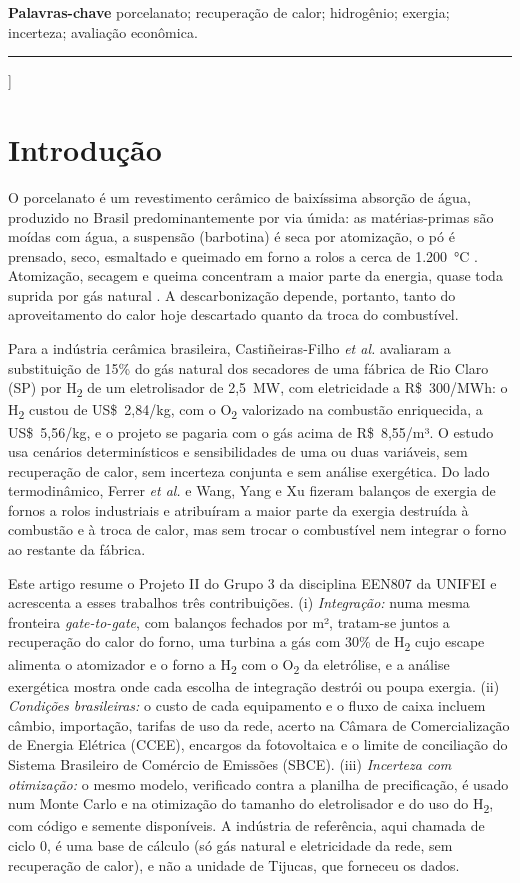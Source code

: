 \documentclass[10pt,a4paper,twocolumn]{article}
\newcommand{\Ht}{H\textsubscript{2}}
\newcommand{\Ot}{O\textsubscript{2}}
\begin{document}
{\vspace{3pt}
\noindent\textbf{Palavras-chave} porcelanato; recuperação de calor; hidrogênio; exergia; incerteza; avaliação econômica.\par
\noindent\rule{\textwidth}{0.4pt}\par\vspace{8pt}
}]

\section{Introdução}

O porcelanato é um revestimento cerâmico de baixíssima absorção de água, produzido no Brasil predominantemente por via úmida: as matérias-primas são moídas com água, a suspensão (barbotina) é seca por atomização, o pó é prensado, seco, esmaltado e queimado em forno a rolos a cerca de 1.200~°C \cite{oliveira2015}. Atomização, secagem e queima concentram a maior parte da energia, quase toda suprida por gás natural \cite{mctic2017,monfort2010}. A descarbonização depende, portanto, tanto do aproveitamento do calor hoje descartado quanto da troca do combustível.

Para a indústria cerâmica brasileira, Castiñeiras-Filho \textit{et al.} \cite{castineiras2025} avaliaram a substituição de 15\% do gás natural dos secadores de uma fábrica de Rio Claro (SP) por \Ht{} de um eletrolisador de 2,5~MW, com eletricidade a R\$~300/MWh: o \Ht{} custou de US\$~2,84/kg, com o \Ot{} valorizado na combustão enriquecida, a US\$~5,56/kg, e o projeto se pagaria com o gás acima de R\$~8,55/m³. O estudo usa cenários determinísticos e sensibilidades de uma ou duas variáveis, sem recuperação de calor, sem incerteza conjunta e sem análise exergética. Do lado termodinâmico, Ferrer \textit{et al.} \cite{ferrer2019} e Wang, Yang e Xu \cite{wang2020} fizeram balanços de exergia de fornos a rolos industriais e atribuíram a maior parte da exergia destruída à combustão e à troca de calor, mas sem trocar o combustível nem integrar o forno ao restante da fábrica.

Este artigo resume o Projeto II do Grupo 3 da disciplina EEN807 da UNIFEI e acrescenta a esses trabalhos três contribuições. (i) \textit{Integração:} numa mesma fronteira \textit{gate-to-gate}, com balanços fechados por m², tratam-se juntos a recuperação do calor do forno, uma turbina a gás com 30\% de \Ht{} cujo escape alimenta o atomizador e o forno a \Ht{} com o \Ot{} da eletrólise, e a análise exergética mostra onde cada escolha de integração destrói ou poupa exergia. (ii) \textit{Condições brasileiras:} o custo de cada equipamento e o fluxo de caixa incluem câmbio, importação, tarifas de uso da rede, acerto na Câmara de Comercialização de Energia Elétrica (CCEE), encargos da fotovoltaica e o limite de conciliação do Sistema Brasileiro de Comércio de Emissões (SBCE). (iii) \textit{Incerteza com otimização:} o mesmo modelo, verificado contra a planilha de precificação, é usado num Monte Carlo e na otimização do tamanho do eletrolisador e do uso do \Ht, com código e semente disponíveis. A indústria de referência, aqui chamada de ciclo 0, é uma base de cálculo (só gás natural e eletricidade da rede, sem recuperação de calor), e não a unidade de Tijucas, que forneceu os dados.
\end{document}
